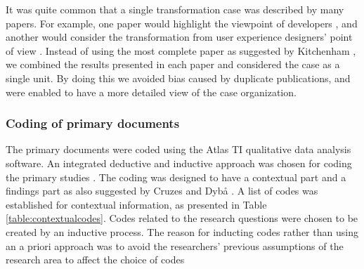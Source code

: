 \documentclass[preprint,authoryear,12pt]{elsarticle}
\begin{document}
It was quite common that a single transformation case was described by many
papers. For example, one paper would highlight the viewpoint of developers
\cite{Fry2007}, and another would consider the transformation from user
experience designers' point of view \cite{Federoff2009}. Instead of using the
most complete paper as suggested by Kitchenham \cite{Kitchenham2007}, we
combined the results presented in each paper and considered the case as a single
unit. By doing this we avoided bias caused by duplicate publications, and were
enabled to have a more detailed view of the case organization.


\subsubsection{Coding of primary documents}

The primary documents were coded using the Atlas TI qualitative data analysis software.
An integrated deductive and inductive approach was chosen for coding the primary
studies \cite{Cruzes2011a}. The coding was designed to have a contextual part
and a findings part as also suggested by Cruzes and Dybå \cite{Cruzes2011a}. A
list of codes was established for contextual information, as presented in Table
\ref{table:contextualcodes}. Codes related to the research questions were chosen
to be created by an inductive process. The reason for inducting codes rather
than using an a priori approach was to avoid the researchers' previous
assumptions of the research area to affect the choice of codes
\end{document}
